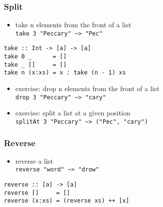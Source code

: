 \documentclass[dvipsnames]{beamer}
\theoremstyle{plain}
\begin{document}
\begin{frame}[fragile]
  \frametitle{Split}

  \begin{itemize}
    \item take n elements from the front of a list\\
      \lstinline[style=exclamfix]|take 3 "Peccary" ~> "Pec"|
  \end{itemize}

  \begin{exampleblock}{}
    \begin{lstlisting}[deletekeywords={take}]
take :: Int -> [a] -> [a]
take 0 _      = []
take _ []     = []
take n (x:xs) = x : take (n - 1) xs
    \end{lstlisting}
  \end{exampleblock}

  \pause
  \begin{itemize}
    \item exercise: drop n elements from the front of a list\\
      \lstinline[style=exclamfix]|drop 3 "Peccary" ~> "cary"|

    \item exercise: split a list at a given position\\
      \lstinline[style=exclamfix]|splitAt 3 "Peccary" ~> ("Pec", "cary")|
  \end{itemize}
\end{frame}

\begin{frame}[fragile]
  \frametitle{Reverse}

  \begin{itemize}
    \item reverse a list\\
      \lstinline[style=exclamfix]|reverse "word" ~> "drow"|
  \end{itemize}

  \begin{exampleblock}{}
    \begin{lstlisting}[deletekeywords={reverse}]
reverse :: [a] -> [a]
reverse []     = []
reverse (x:xs) = (reverse xs) ++ [x]
    \end{lstlisting}
  \end{exampleblock}
\end{frame}
\end{document}
